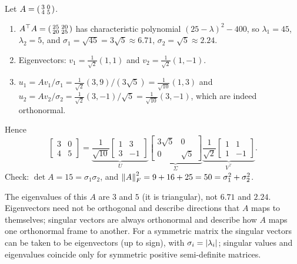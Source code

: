 \begin{notechapter}
\begin{example}\label{svd:ex:2x2}
Let $A = \begin{psmallmatrix}3&0\\4&5\end{psmallmatrix}$.
\begin{enumerate}
  \item $A^\top A = \begin{psmallmatrix}25&20\\20&25\end{psmallmatrix}$ has characteristic polynomial
        $(25-\lambda)^2 - 400$, so $\lambda_1 = 45$, $\lambda_2 = 5$, and
        $\sigma_1 = \sqrt{45} = 3\sqrt5\approx6.71$, $\sigma_2 = \sqrt5\approx2.24$.
  \item Eigenvectors: $v_1 = \frac1{\sqrt2}(1,1)$ and $v_2 = \frac1{\sqrt2}(1,-1)$.
  \item $u_1 = Av_1/\sigma_1 = \frac{1}{\sqrt2}(3,9)/(3\sqrt5) = \frac1{\sqrt{10}}(1,3)$ and
        $u_2 = Av_2/\sigma_2 = \frac1{\sqrt2}(3,-1)/\sqrt5 = \frac1{\sqrt{10}}(3,-1)$, which are indeed
        orthonormal.
\end{enumerate}
Hence
\[
  \begin{bmatrix}3&0\\4&5\end{bmatrix}
  = \underbrace{\frac1{\sqrt{10}}\begin{bmatrix}1&3\\3&-1\end{bmatrix}}_{U}
    \underbrace{\begin{bmatrix}3\sqrt5&0\\0&\sqrt5\end{bmatrix}}_{\Sigma}
    \underbrace{\frac1{\sqrt2}\begin{bmatrix}1&1\\1&-1\end{bmatrix}}_{V^\top}.
\]
Check: $\det A = 15 = \sigma_1\sigma_2$, and $\left\|A\right\|_F^2 = 9+16+25 = 50 = \sigma_1^2+\sigma_2^2$.
\end{example}

\begin{pitfall}
The eigenvalues of this $A$ are $3$ and $5$ (it is triangular), not $6.71$ and $2.24$.
Eigenvectors need not be orthogonal and describe directions that $A$ maps to
themselves; singular vectors are always orthonormal and describe how $A$ maps one
orthonormal frame to another. For a symmetric matrix the singular vectors can be taken to be
eigenvectors (up to sign), with $\sigma_i = \left|\lambda_i\right|$; singular values and eigenvalues
coincide only for symmetric positive semi-definite matrices.
\end{pitfall}


\end{notechapter}
